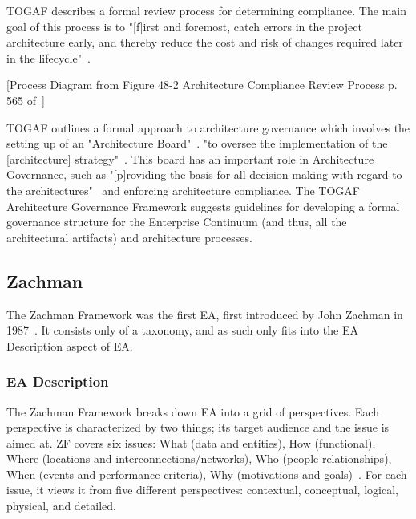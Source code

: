 TOGAF describes a formal review process for determining compliance. The main goal of this process is to "[f]irst and foremost, catch errors in the project architecture early, and thereby reduce the cost and risk of changes required later in the lifecycle"~\cite{togaf9.1}.

[Process Diagram from Figure 48-2 Architecture Compliance Review Process p. 565 of~\cite{togaf9.1}]


TOGAF outlines a formal approach to architecture governance which involves the setting up of an "Architecture Board"~\cite{togaf9.1}. "to oversee the implementation of the [architecture] strategy"~\cite{togaf9.1}. This board has an important role in Architecture Governance, such as "[p]roviding the basis for all decision-making with regard to the architectures"~\cite{togaf9.1} and enforcing architecture compliance. The TOGAF Architecture Governance Framework suggests guidelines for developing a formal governance structure for the Enterprise Continuum (and thus, all the architectural artifacts) and architecture processes. 



%

\subsection{Zachman}
The Zachman Framework was the first EA, first introduced by John Zachman in 1987~\cite{sessions2007,zachman}. It consists only of a taxonomy, and as such only fits into the EA Description aspect of EA. 

\subsubsection{EA Description}



The Zachman Framework breaks down EA into a grid of perspectives. Each perspective is characterized by two things; its target audience and the issue is aimed at. ZF covers six issues: What (data and entities), How (functional), Where (locations and interconnections/networks), Who (people relationships), When (events and performance criteria), Why (motivations and goals)~\cite{jungle2004}. For each issue, it views it from five different perspectives: contextual, conceptual, logical, physical, and detailed. 

